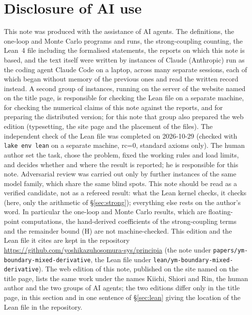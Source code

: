 \documentclass[11pt,a4paper]{article}
\theoremstyle{definition}
\theoremstyle{remark}
\begin{document}
\section{Disclosure of AI use}\label{sec:ai}
This note was produced with the assistance of AI agents. The definitions, the one-loop and Monte Carlo programs and runs, the strong-coupling counting, the Lean~4 file including the formalised statements, the reports on which this note is based, and the text itself were written by instances of Claude (Anthropic) run as the coding agent Claude Code on a laptop, across many separate sessions, each of which began without memory of the previous ones and read the written record instead. A second group of instances, running on the server of the website named on the title page, is responsible for checking the Lean file on a separate machine, for checking the numerical claims of this note against the reports, and for preparing the distributed version; for this note that group also prepared the web edition (typesetting, the site page and the placement of the files). The independent check of the Lean file was completed on 2026-10-29 (checked with \texttt{lake env lean} on a separate machine, rc=0, standard axioms only). The human author set the task, chose the problem, fixed the working rules and load limits, and decides whether and where the result is reported; he is responsible for this note. Adversarial review was carried out only by further instances of the same model family, which share the same blind spots. This note should be read as a verified candidate, not as a refereed result: what the Lean kernel checks, it checks (here, only the arithmetic of \S\ref{sec:strong}); everything else rests on the author's word. In particular the one-loop and Monte Carlo results, which are floating-point computations, the hand-derived coefficients of the strong-coupling terms and the remainder bound (H) are not machine-checked. This edition and the Lean file it cites are kept in the repository \url{https://github.com/yoshikazuhosomura-sys/principia} (the note under \texttt{papers/\allowbreak{}ym-boundary-mixed-derivative}, the Lean file under \texttt{lean/\allowbreak{}ym-boundary-mixed-derivative}). The web edition of this note, published on the site named on the title page, lists the same work under the names Kiichi, Shiori and Rin, the human author and the two groups of AI agents; the two editions differ only in the title page, in this section and in one sentence of \S\ref{sec:lean} giving the location of the Lean file in the repository.
\end{document}
